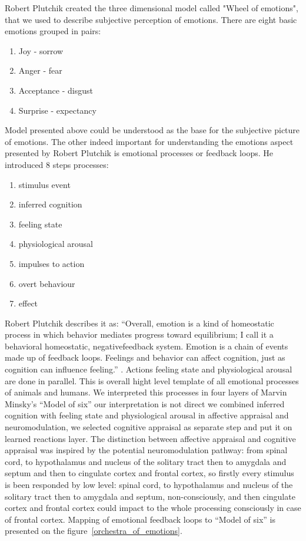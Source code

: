 Robert Plutchik created the three dimensional model \cite{natureofemotions} called "Wheel of emotions", that we used to describe subjective perception of emotions. There are eight basic emotions grouped in pairs:

\begin{enumerate}
 \item  Joy - sorrow
 \item  Anger - fear
 \item  Acceptance - disgust
 \item  Surprise - expectancy
\end{enumerate}

Model presented above could be understood as the base for the subjective picture of emotions. The other indeed important for understanding the emotions aspect presented by Robert Plutchik is emotional processes or feedback loops. He introduced 8 steps processes:

\begin{enumerate}
 \item{stimulus event}
 \item{inferred cognition}
 \item{feeling state}
 \item{physiological arousal}
 \item{impulses to action}
 \item{overt behaviour}
 \item{effect}
\end{enumerate}

Robert Plutchik describes it as: ``Overall, emotion is a kind of homeostatic process in which behavior mediates progress toward equilibrium; I call it a behavioral homeostatic, negativefeedback system. Emotion is a chain of events made up of feedback loops. Feelings and behavior can affect cognition, just as cognition can influence feeling.'' \cite{natureofemotions}. Actions feeling state and physiological arousal are done in parallel. This is overall hight level template of all emotional processes of animals and humans. We interpreted this processes in four layers of Marvin Minsky's ``Model of six'' our interpretation is not direct we combined inferred cognition with feeling state and physiological arousal in affective appraisal and neuromodulation, we selected cognitive appraisal as separate step and put it on learned reactions layer. The distinction between affective appraisal and cognitive appraisal was inspired by \cite{emotionsbraintorobot, neuromodulatory} the potential neuromodulation pathway: from spinal cord, to hypothalamus and nucleus of the solitary tract then to amygdala and septum and then to cingulate cortex and frontal cortex, so firstly every stimulus is been responded by low level: spinal cord, to hypothalamus and nucleus of the solitary tract then to amygdala and septum, non-consciously, and then cingulate cortex and frontal cortex could impact to the whole processing consciously in case of frontal cortex. 
Mapping of emotional feedback loops to ``Model of six'' is presented on the figure~\ref{orchestra_of_emotions}.

